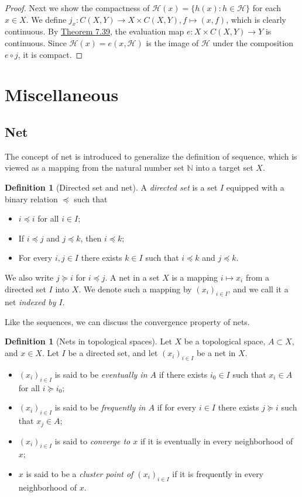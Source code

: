 \documentclass{article}
\numberwithin{equation}{section}
\newcommand{\bbN}{\mathbb{N}}
\theoremstyle{plain}
\theoremstyle{definition}
\newtheorem{definition}[theorem]{Definition}
\begin{document}
\begin{proof}
Next we show the compactness of $\mathcal{H}(x)=\{h(x):h\in\mathcal{H}\}$ for each $x\in X$. We define $j_x:C(X,Y)\to X\times C(X,Y),f\mapsto (x,f)$, which is clearly continuous. By \hyperref[thm:7.39]{Theorem 7.39}, the evaluation map $e:X\times C(X,Y)\to Y$ is continuous. Since $\mathcal{H}(x)=e(x,\mathcal{H})$ is the image of $\mathcal{H}$ under the composition $e\circ j$, it is compact.
\end{proof}

\newpage
\section{Miscellaneous}
\subsection{Net}
The concept of net is introduced to generalize the definition of sequence, which is viewed as a mapping from the natural number set $\bbN$ into a target set $X$.
\begin{definition}[Directed set and net]
A \textit{directed set} is a set $I$ equipped with a binary relation $\preceq$ such that
\begin{itemize}
	\item $i\preceq i$ for all $i\in I$;
	\item If $i\preceq j$ and $j\preceq k$, then $i\preceq k$;
	\item For every $i,j\in I$ there exists $k\in I$ such that $i\preceq k$ and $j\preceq k$.
\end{itemize}
We also write $j\succeq i$ for $i\preceq j$. A net in a set $X$ is a mapping $i\mapsto x_i$ from a directed set $I$ into $X$. We denote such a mapping by $(x_i)_{i\in I}$, and we call it a net \textit{indexed by $I$}.
\end{definition}
Like the sequences, we can discuss the convergence property of nets.
\begin{definition}[Nets in topological spaces]
Let $X$ be a topological space, $A\subset X$, and $x\in X$. Let $I$ be a directed set, and let $(x_i)_{i\in I}$ be a net in $X$.
\begin{itemize}
	\item $(x_i)_{i\in I}$ is said to be \textit{eventually in $A$} if there exists $i_0\in I$ such that $x_i\in A$ for all $i\succeq i_0$;
	\item $(x_i)_{i\in I}$ is said to be \textit{frequently in $A$} if for every $i\in I$ there exists $j\succeq i$ such that $x_j\in A$;
	\item $(x_i)_{i\in I}$ is said to \textit{converge to $x$} if it is eventually in every neighborhood of $x$;
	\item $x$ is said to be a \textit{cluster point of $(x_i)_{i\in I}$} if it is frequently in every neighborhood of $x$.
\end{itemize}
\end{definition}
\end{document}

